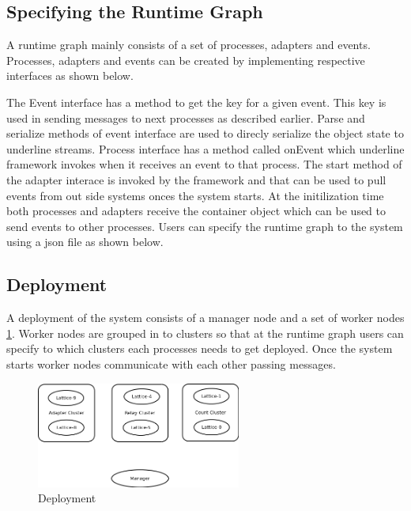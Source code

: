 \subsection{Specifying the Runtime Graph}

A runtime graph mainly consists of a set of processes, adapters and events. Processes, adapters and events can be created by implementing respective interfaces as shown below.



 The Event interface has a method to get the key for a given event. This key is used in sending messages to next processes as described earlier. Parse and serialize methods of event interface are used to direcly serialize the object state to underline streams. Process interface has a method called onEvent which underline framework invokes when it receives an event to that process. The start method of the adapter interace is invoked by the framework and that can be used to pull events from out side systems onces the system starts. At the initilization time both processes and adapters receive the container object which can be used to send events to other processes. Users can specify the runtime graph to the system using a json file as shown below. 



\subsection{Deployment}

A deployment of the system consists of a manager node and a set of worker nodes \ref{deployment}. Worker nodes are grouped in to clusters so that at the runtime graph users can specify to which clusters each processes needs to get deployed. Once the system starts worker nodes communicate with each other passing messages.

\begin{figure}
        \centering
        \includegraphics[width=0.6\textwidth]{deployment.png}
        \caption{Deployment}
        \label{deployment}
\end{figure}



 